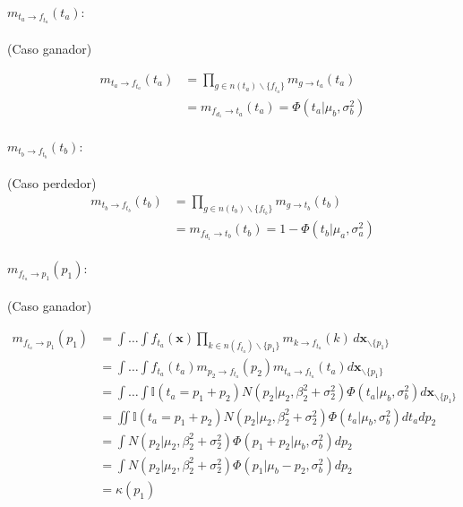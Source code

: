 \documentclass[11pt,twoside,spanish]{report} %
\begin{document}
\paragraph{$m_{t_a \rightarrow f_{t_a}}(t_a):$} (Caso ganador)

\begin{equation}
	\begin{split}
		m_{t_a \rightarrow f_{t_a}}(t_a) & = \prod_{g\in n(t_a)\backslash\{f_{t_a}\}} m_{g \rightarrow t_a} (t_a) \\
		&=  m_{f_{d_1} \rightarrow t_a} (t_a)=\Phi(t_a|\mu_b,\sigma_b^2)
	\end{split}
\end{equation}

\paragraph{$m_{t_b \rightarrow f_{t_b}}(t_b):$} (Caso perdedor)
\begin{equation}
	\begin{split}
		m_{t_b \rightarrow f_{t_b}}(t_b) & =\prod_{g\in n(t_b)\backslash\{f_{t_b}\}} m_{g \rightarrow t_b} (t_b)\\
		&=  m_{f_{d_1} \rightarrow t_b} (t_b)=1- \Phi(t_b|\mu_a,\sigma_a^2)
	\end{split}
\end{equation}

\paragraph{$m_{f_{t_a} \rightarrow p_1}(p_1):$} (Caso ganador)

\begin{equation}
	\begin{split}
		m_{f_{t_a} \rightarrow p_1}(p_1)  & = \int \dots \int f_{t_a}(\textbf{x}) \prod_{k\in n(f_{t_a})\backslash\{p_1\}} m_{k\rightarrow f_{t_a}}(k) \, d\textbf{x}_{\backslash \{p_1\} }  \\
		&= \int \dots \int f_{t_a}(t_a) m_{p_2\rightarrow f_{t_a}}(p_2)m_{t_a\rightarrow f_{t_a}}(t_a)d\textbf{x}_{\backslash \{p_1\} }\\
		&= \int \dots \int \mathbb{I}( t_a = p_1 + p_2) N(p_2| \mu_2, \beta_2^2 + \sigma_2^2 )  \Phi (t_a| \mu_b , \sigma_b^2 )  d\textbf{x}_{\backslash \{p_1\} }\\
		&= \iint \mathbb{I}( t_a = p_1 + p_2)  N(p_2| \mu_2, \beta_2^2 + \sigma_2^2 )  \Phi (t_a| \mu_b , \sigma_b^2 )  dt_a dp_2 \\
		&= \int   N(p_2| \mu_2, \beta_2^2 + \sigma_2^2 )  \Phi (p_1 + p_2| \mu_b , \sigma_b^2 )  dp_2 \\
		&= \int  N(p_2| \mu_2, \beta_2^2 + \sigma_2^2 )  \Phi (p_1 | \mu_b - p_2 , \sigma_b^2)  dp_2 \\
		&= \kappa(p_1)
	\end{split}
\end{equation}
\end{document}
